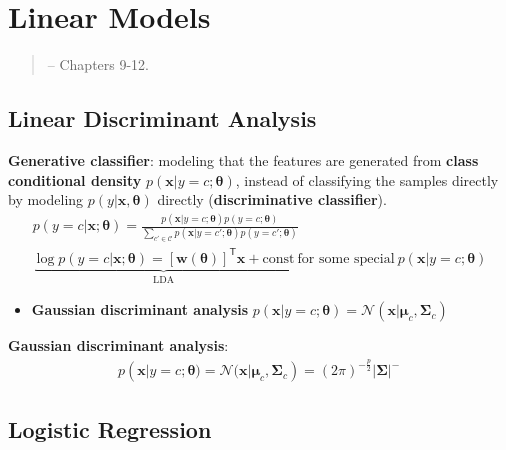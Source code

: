 \section{Linear Models}

\begin{quote}
    \citep{pml1Book} -- Chapters 9-12.
\end{quote}

\subsection{Linear Discriminant Analysis}

\textbf{Generative classifier}: 
modeling that the features are generated from \textbf{class conditional density} $p(\bm{x}|y=c;\bm{\theta})$,
instead of classifying the samples directly by modeling $p(y|\bm{x},\bm{\theta})$ directly (\textbf{discriminative classifier}).
\begin{gather}
    p(y=c|\bm{x};\bm{\theta})=
    \frac{p(\bm{x}|y=c;\bm{\theta})p(y=c;\bm{\theta})}
    {\sum_{c'\in\mathcal{C}}p(\bm{x}|y=c';\bm{\theta})p(y=c';\bm{\theta})}\\
    \underbrace{
    \log{p(y=c|\bm{x};\bm{\theta})}=[\bm{w}(\bm{\theta})]^\mathsf{T}\bm{x}+\text{const}}_\text{LDA}
    ~\text{for some special}~p(\bm{x}|y=c;\bm{\theta})
\end{gather}
\begin{itemize}
    \item \textbf{Gaussian discriminant analysis} $p(\bm{x}|y=c;\bm{\theta})=\mathcal{N}(\bm{x}|\bm{\mu}_c,\bm{\Sigma}_c)$
\end{itemize}

\textbf{Gaussian discriminant analysis}: 
\begin{gather}
    p(\bm{x}|y=c;\bm{\theta})
    =\mathcal{N}(\bm{x}|\bm{\mu}_c,\bm{\Sigma}_c)
    =(2\pi)^{-\frac{p}{2}}|\bm{\Sigma}|^{-\frac{}{}}
\end{gather}


\subsection{Logistic Regression}